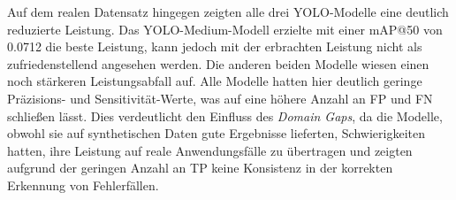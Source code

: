 Auf dem realen Datensatz hingegen zeigten alle drei \ac{YOLO}-Modelle eine deutlich reduzierte Leistung. Das \ac{YOLO}-Medium-Modell erzielte mit einer \ac{mAP}@50 von 0.0712 die beste Leistung, kann jedoch mit der erbrachten Leistung nicht als zufriedenstellend angesehen werden. Die anderen beiden Modelle wiesen einen noch stärkeren Leistungsabfall auf. Alle Modelle hatten hier deutlich geringe Präzisions- und Sensitivität-Werte, was auf eine höhere Anzahl an \ac{FP} und \ac{FN} schließen lässt. Dies verdeutlicht den Einfluss des \textit{Domain Gaps}, da die Modelle, obwohl sie auf synthetischen Daten gute Ergebnisse lieferten, Schwierigkeiten hatten, ihre Leistung auf reale Anwendungsfälle zu übertragen und zeigten aufgrund der geringen Anzahl an \ac{TP} keine Konsistenz in der korrekten Erkennung von Fehlerfällen.

\begin{table}[htb]
\centering
\caption{Ergebnisse zentraler Metriken der \ac{KI}-Modelle mit \textit{Confidence Threshold 0.1}}
\label{tab:yolo_results}
\end{table}


